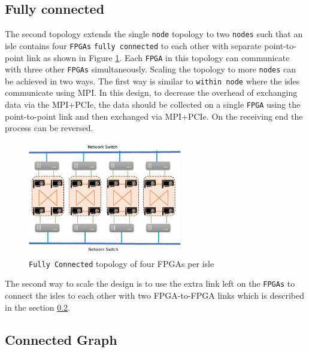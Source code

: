 \subsection{Fully connected}
\label{sec:fully_connect}

The second topology extends the single \texttt{node} topology to two \texttt{nodes} such that
an isle contains four \texttt{FPGAs} \texttt{fully connected} to each other with separate
point-to-point link as shown in Figure \ref{fig:fully_connect}.
Each \texttt{FPGA} in this topology can communicate with three
other \texttt{FPGAs} simultaneously. Scaling the topology to more \texttt{nodes} can be achieved
in two ways. The first way is similar to \texttt{within node} where the isles communicate
using MPI. In this design, to decrease the overhead of exchanging data via the
MPI+PCIe, the data should be collected on a single \texttt{FPGA} using the point-to-point
link and then exchanged via MPI+PCIe. On the receiving end the process can be
reversed.


\begin{figure}[h]%
    \centering
    \includegraphics[width=0.6\textwidth]{images/full_connect}
    \caption{\texttt{Fully Connected} topology of four FPGAs per isle}
    \label{fig:fully_connect}
\end{figure}

The second way to scale the design is to use the extra link left on the
\texttt{FPGAs} to connect the isles to each other with two FPGA-to-FPGA links which is
described in the section \ref{sec:connected_graph}.

\subsection{Connected Graph}
\label{sec:connected_graph}

